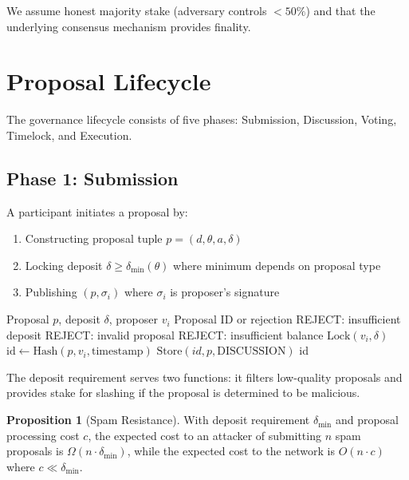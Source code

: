 \documentclass[11pt,a4paper]{article}
\theoremstyle{definition}
\newtheorem{proposition}[theorem]{Proposition}
\theoremstyle{remark}
\begin{document}
We assume honest majority stake (adversary controls $< 50\%$) and that the underlying consensus mechanism provides finality.

\section{Proposal Lifecycle}

The governance lifecycle consists of five phases: Submission, Discussion, Voting, Timelock, and Execution.

\subsection{Phase 1: Submission}

A participant initiates a proposal by:
\begin{enumerate}
    \item Constructing proposal tuple $p = (d, \theta, a, \delta)$
    \item Locking deposit $\delta \geq \delta_{\min}(\theta)$ where minimum depends on proposal type
    \item Publishing $(p, \sigma_i)$ where $\sigma_i$ is proposer's signature
\end{enumerate}

\begin{algorithm}
\caption{Proposal Submission}
\begin{algorithmic}[1]
\Require Proposal $p$, deposit $\delta$, proposer $v_i$
\Ensure Proposal ID or rejection
    \State \Return REJECT: insufficient deposit
\EndIf
{}
    \State \Return REJECT: invalid proposal
\EndIf
{}
    \State \Return REJECT: insufficient balance
\EndIf
\State $\text{Lock}(v_i, \delta)$
\State $\text{id} \gets \text{Hash}(p, v_i, \text{timestamp})$
\State $\text{Store}(id, p, \text{DISCUSSION})$
\State \Return id
\end{algorithmic}
\end{algorithm}

The deposit requirement serves two functions: it filters low-quality proposals and provides stake for slashing if the proposal is determined to be malicious.

\begin{proposition}[Spam Resistance]
With deposit requirement $\delta_{\min}$ and proposal processing cost $c$, the expected cost to an attacker of submitting $n$ spam proposals is $\Omega(n \cdot \delta_{\min})$, while the expected cost to the network is $O(n \cdot c)$ where $c \ll \delta_{\min}$.
\end{proposition}
\end{document}
